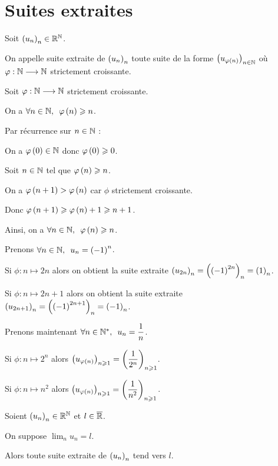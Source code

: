 \section{Suites extraites}

\begin{defi}
Soit \(\left(u_n\right)_n\in\mathbb{R}^{\mathbb{N}}\).

On appelle suite extraite de \(\left(u_n\right)_n\) toute suite de la forme \(\left(u_{\varphi\left(n\right)}\right)_{n\in\mathbb{N}}\) où \(\varphi:\mathbb{N}\longrightarrow\mathbb{N}\) strictement croissante.
\end{defi}

\begin{rem}
Soit \(\varphi:\mathbb{N}\longrightarrow\mathbb{N}\) strictement croissante.

On a \(\quantifs{\forall n\in\N}\phi\paren{n}\geq n\).
\end{rem}

\begin{dem}
Par récurrence sur \(n\in\mathbb{N}\) :

On a \(\varphi\left(0\right)\in\mathbb{N}\) donc \(\varphi\left(0\right)\geqslant 0\).

Soit \(n\in\mathbb{N}\) tel que \(\varphi\left(n\right)\geqslant n\).

On a \(\varphi\left(n+1\right)>\varphi\left(n\right)\) car \(\phi\) strictement croissante.

Donc \(\varphi\left(n+1\right)\geqslant\varphi\left(n\right)+1\geqslant n+1\).

Ainsi, on a \(\quantifs{\forall n\in\N}\phi\paren{n}\geq n\).
\end{dem}

\begin{ex}
Prenons \(\quantifs{\forall n\in\N}u_n=\paren{-1}^n\).

Si \(\phi:n\mapsto2n\) alors on obtient la suite extraite \(\left(u_{2n}\right)_n=\left(\left(-1\right)^{2n}\right)_n=\left(1\right)_n\).

Si \(\phi:n\mapsto2n+1\) alors on obtient la suite extraite \(\left(u_{2n+1}\right)_n=\left(\left(-1\right)^{2n+1}\right)_n=\left(-1\right)_n\).

Prenons maintenant \(\quantifs{\forall n\in\Ns}u_n=\dfrac{1}{n}\).

Si \(\phi:n\mapsto2^n\) alors \(\left(u_{\varphi\left(n\right)}\right)_{n\geqslant1}=\left(\dfrac{1}{2^n}\right)_{n\geqslant1}\).

Si \(\phi:n\mapsto n^2\) alors \(\left(u_{\varphi\left(n\right)}\right)_{n\geqslant1}=\left(\dfrac{1}{n^2}\right)_{n\geqslant1}\).
\end{ex}

\begin{theo}
Soient \(\left(u_n\right)_n\in\mathbb{R}^{\mathbb{N}}\) et \(l\in\overline{\mathbb{R}}\).

On suppose \(\lim_nu_n=l\).

Alors toute suite extraite de \(\left(u_n\right)_n\) tend vers \(l\).
\end{theo}

